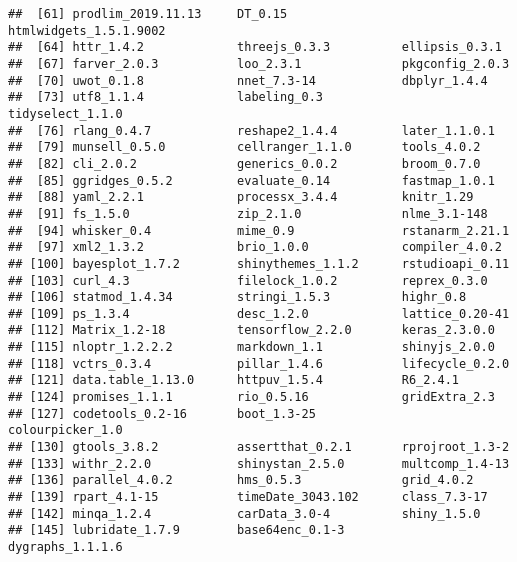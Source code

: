 \documentclass[
]{article}
\begin{document}
\begin{verbatim}
##  [61] prodlim_2019.11.13     DT_0.15                htmlwidgets_1.5.1.9002
##  [64] httr_1.4.2             threejs_0.3.3          ellipsis_0.3.1        
##  [67] farver_2.0.3           loo_2.3.1              pkgconfig_2.0.3       
##  [70] uwot_0.1.8             nnet_7.3-14            dbplyr_1.4.4          
##  [73] utf8_1.1.4             labeling_0.3           tidyselect_1.1.0      
##  [76] rlang_0.4.7            reshape2_1.4.4         later_1.1.0.1         
##  [79] munsell_0.5.0          cellranger_1.1.0       tools_4.0.2           
##  [82] cli_2.0.2              generics_0.0.2         broom_0.7.0           
##  [85] ggridges_0.5.2         evaluate_0.14          fastmap_1.0.1         
##  [88] yaml_2.2.1             processx_3.4.4         knitr_1.29            
##  [91] fs_1.5.0               zip_2.1.0              nlme_3.1-148          
##  [94] whisker_0.4            mime_0.9               rstanarm_2.21.1       
##  [97] xml2_1.3.2             brio_1.0.0             compiler_4.0.2        
## [100] bayesplot_1.7.2        shinythemes_1.1.2      rstudioapi_0.11       
## [103] curl_4.3               filelock_1.0.2         reprex_0.3.0          
## [106] statmod_1.4.34         stringi_1.5.3          highr_0.8             
## [109] ps_1.3.4               desc_1.2.0             lattice_0.20-41       
## [112] Matrix_1.2-18          tensorflow_2.2.0       keras_2.3.0.0         
## [115] nloptr_1.2.2.2         markdown_1.1           shinyjs_2.0.0         
## [118] vctrs_0.3.4            pillar_1.4.6           lifecycle_0.2.0       
## [121] data.table_1.13.0      httpuv_1.5.4           R6_2.4.1              
## [124] promises_1.1.1         rio_0.5.16             gridExtra_2.3         
## [127] codetools_0.2-16       boot_1.3-25            colourpicker_1.0      
## [130] gtools_3.8.2           assertthat_0.2.1       rprojroot_1.3-2       
## [133] withr_2.2.0            shinystan_2.5.0        multcomp_1.4-13       
## [136] parallel_4.0.2         hms_0.5.3              grid_4.0.2            
## [139] rpart_4.1-15           timeDate_3043.102      class_7.3-17          
## [142] minqa_1.2.4            carData_3.0-4          shiny_1.5.0           
## [145] lubridate_1.7.9        base64enc_0.1-3        dygraphs_1.1.1.6
\end{verbatim}
\end{document}
